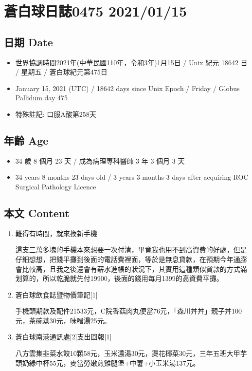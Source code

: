 \documentclass[a5paper, 10pt
]{book}
\providecommand{\tightlist}{%
  \setlength{\itemsep}{0pt}\setlength{\parskip}{0pt}}
\begin{document}
\hypertarget{ux84bcux767dux7403ux65e5ux8a8c0475-20210115}{%
\section{蒼白球日誌0475
2021/01/15}\label{ux84bcux767dux7403ux65e5ux8a8c0475-20210115}}

\hypertarget{ux65e5ux671f-date-45}{%
\subsection{日期 Date}\label{ux65e5ux671f-date-45}}

\begin{itemize}
\tightlist
\item
  世界協調時間2021年(中華民國110年，令和3年)1月15日 / Unix 紀元 18642 日
  / 星期五 / 蒼白球紀元第475日
\item
  January 15, 2021 (UTC) / 18642 days since Unix Epoch / Friday / Globus
  Pallidum day 475
\item
  特殊註記: 口服A酸第258天
\end{itemize}

\hypertarget{ux5e74ux9f61-age-45}{%
\subsection{年齡 Age}\label{ux5e74ux9f61-age-45}}

\begin{itemize}
\tightlist
\item
  34 歲 8 個月 23 天 / 成為病理專科醫師 3 年 3 個月 3 天
\item
  34 years 8 months 23 days old / 3 years 3 months 3 days after
  acquiring ROC Surgical Pathology Licence
\end{itemize}

\hypertarget{ux672cux6587-content-45}{%
\subsection{本文 Content}\label{ux672cux6587-content-45}}

\begin{enumerate}
\def\labelenumi{\arabic{enumi}.}
\item
  難得有時間，就來換新手機

  這支三萬多塊的手機本來想要一次付清，畢竟我也用不到高資費的好處，但是仔細想想，把錢平攤到後面的電話費裡面，等於是無息貸款，在預期今年通膨會比較高，且我之後還會有薪水進帳的狀況下，其實用這種類似貸款的方式滿划算的，所以乾脆就先付19900，後面的錢用每月1399的高資費平攤。
\item
  蒼白球飲食誌暨物價筆記{[}1{]}

  手機頭期款及配件21533元，C院香菇肉丸便當76元，「森川丼丼」親子丼100元，茶碗蒸30元，味噌湯25元。
\item
  蒼白球南港通訊處{[}2{]}支出回報{[}1{]}

  八方雲集韭菜水餃10顆58元，玉米濃湯30元，燙花椰菜30元，三年五班大甲芋頭奶綠中杯55元，麥當勞嫩煎雞腿堡+中薯+小玉米湯137元。
\end{enumerate}
\end{document}
